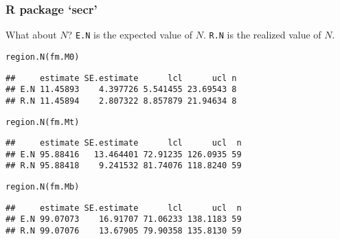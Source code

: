 \documentclass[color=usenames,dvipsnames]{beamer}\usepackage[]{graphicx}\usepackage[]{color}
\makeatletter
\newcommand{\hlstd}[1]{\textcolor[rgb]{0,0,0}{#1}}%
\newcommand{\hlkwd}[1]{\textcolor[rgb]{0.004,0.004,0.506}{#1}}%
\newenvironment{kframe}{%
 \def\at@end@of@kframe{}%
 \ifinner\ifhmode%
  \def\at@end@of@kframe{\end{minipage}}%
  \begin{minipage}{\columnwidth}%
 \fi\fi%
 \def\FrameCommand##1{\hskip\@totalleftmargin \hskip-\fboxsep
 \colorbox{shadecolor}{##1}\hskip-\fboxsep
     \hskip-\linewidth \hskip-\@totalleftmargin \hskip\columnwidth}%
 \MakeFramed {\advance\hsize-\width
   \@totalleftmargin\z@ \linewidth\hsize
   \@setminipage}}%
 {\par\unskip\endMakeFramed%
 \at@end@of@kframe}
\newenvironment{knitrout}{}{} %
\newcommand{\inr}[1]{\colorbox{inlinecolor}{\texttt{#1}}}
\makeatother
\begin{document}
\begin{frame}[fragile]
  \frametitle{R package `secr'}
  What about $N$? \pause \inr{E.N} is the expected value of
  $N$. \inr{R.N} is the realized value of $N$. 
  \vfill
\begin{knitrout}\footnotesize
{}\color{fgcolor}\begin{kframe}
\begin{alltt}
\hlkwd{region.N}\hlstd{(fm.M0)}
\end{alltt}
\begin{verbatim}
##     estimate SE.estimate      lcl      ucl n
## E.N 11.45893    4.397726 5.541455 23.69543 8
## R.N 11.45894    2.807322 8.857879 21.94634 8
\end{verbatim}
\end{kframe}
\end{knitrout}
  \pause
\begin{knitrout}\footnotesize
{}\color{fgcolor}\begin{kframe}
\begin{alltt}
\hlkwd{region.N}\hlstd{(fm.Mt)}
\end{alltt}
\begin{verbatim}
##     estimate SE.estimate      lcl      ucl  n
## E.N 95.88416   13.464401 72.91235 126.0935 59
## R.N 95.88418    9.241532 81.74076 118.8240 59
\end{verbatim}
\end{kframe}
\end{knitrout}
  \pause
\begin{knitrout}\footnotesize
{}\color{fgcolor}\begin{kframe}
\begin{alltt}
\hlkwd{region.N}\hlstd{(fm.Mb)}
\end{alltt}
\begin{verbatim}
##     estimate SE.estimate      lcl      ucl  n
## E.N 99.07073    16.91707 71.06233 138.1183 59
## R.N 99.07076    13.67905 79.90358 135.8130 59
\end{verbatim}
\end{kframe}
\end{knitrout}
\end{frame}
\end{document}
